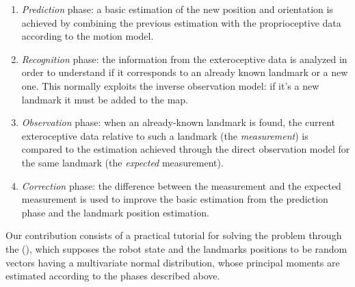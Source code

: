 \begin{enumerate}
	\item \emph{Prediction} phase: a basic estimation of the new position and orientation is achieved by combining the previous estimation with the proprioceptive data according to the motion model.
	\item \emph{Recognition} phase: the information from the exteroceptive data is analyzed in order to understand if it corresponds to an already known landmark or a new one. This normally exploits the inverse observation model: if it's a new landmark it must be added to the map.
	\item \emph{Observation} phase: when an already-known landmark is found, the current exteroceptive data relative to such a landmark (the \emph{measurement}) is compared to the estimation achieved through the direct observation model for the same landmark (the \emph{expected} measurement).
	\item \emph{Correction} phase: the difference between the measurement and the expected measurement is used to improve the basic estimation from the prediction phase and the landmark position estimation.
\end{enumerate}

Our contribution consists of a practical tutorial for solving the \SLAM{} problem through the \emph{\Ekf} (\EKF), which supposes the robot state and the landmarks positions to be random vectors having a multivariate normal distribution, whose principal moments are estimated according to the phases described above.

\nocite{brenner204}
\nocite{frischenschlager2013}
\nocite{slamForDummies}
\nocite{sola204}
\nocite{thrun2005}
